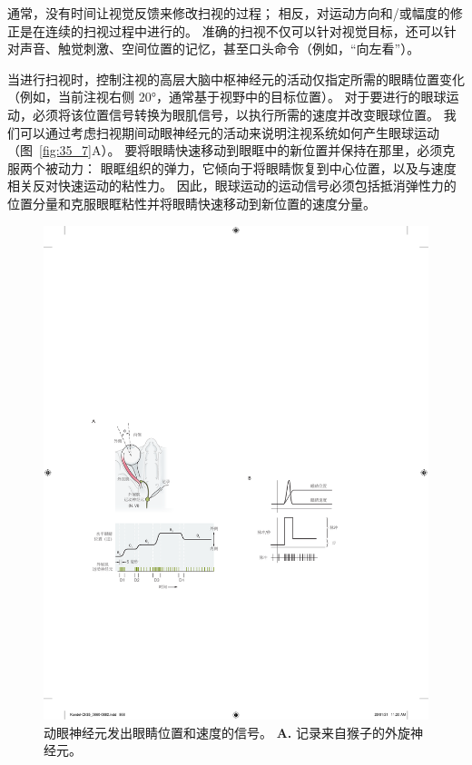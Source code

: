 通常，没有时间让视觉反馈来修改扫视的过程；
相反，对运动方向和/或幅度的修正是在连续的扫视过程中进行的。
准确的扫视不仅可以针对视觉目标，还可以针对声音、触觉刺激、空间位置的记忆，甚至口头命令（例如，“向左看”）。


当进行扫视时，控制注视的高层大脑中枢神经元的活动仅指定所需的眼睛位置变化（例如，当前注视右侧 20°，通常基于视野中的目标位置）。
对于要进行的眼球运动，必须将该位置信号转换为眼肌信号，以执行所需的速度并改变眼球位置。
我们可以通过考虑扫视期间动眼神经元的活动来说明注视系统如何产生眼球运动（图~\ref{fig:35_7}A）。
要将眼睛快速移动到眼眶中的新位置并保持在那里，必须克服两个被动力：
眼眶组织的弹力，它倾向于将眼睛恢复到中心位置，以及与速度相关反对快速运动的粘性力。
因此，眼球运动的运动信号必须包括抵消弹性力的位置分量和克服眼眶粘性并将眼睛快速移动到新位置的速度分量。


\begin{figure}[htbp]
	\centering
	\includegraphics[width=1.0\linewidth]{chap35/fig_35_7}
	\caption{动眼神经元发出眼睛位置和速度的信号。
		\textbf{A.} 记录来自猴子的外旋神经元。
}
\end{figure}
